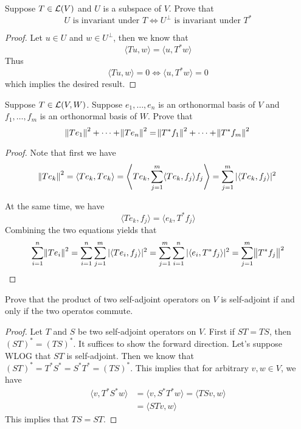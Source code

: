 \documentclass{extarticle}
\begin{document}
\begin{problem}{4}
    Suppose \(T \in \mathcal{L}(V)\) and \(U\) is a subspace of \(V\). Prove that 
    \[U \text{ is invariant under } T \Longleftrightarrow U^\perp \text{ is invariant under }T^*\]
\end{problem}

\begin{proof}
Let \(u \in U\) and \(w \in U^\perp\), then we know that 
\[\langle Tu,w \rangle = \langle u,T^*w \rangle\]
Thus 
\[\langle Tu,w \rangle = 0 \Longleftrightarrow \langle u,T^*w \rangle = 0\]
which implies the desired result.
\end{proof}

\begin{problem}{5}
    Suppose \(T \in \mathcal{L}(V, W)\). Suppose \(e_1, \ldots, e_n\) is an orthonormal basis of \(V\) and 
    \(f_1, \ldots, f_m\) is an orthonormal basis of \(W\). Prove that 
    \[\norm{T e_1}^2 + \cdots + \norm{T e_n}^2 = \norm{T^* f_1 }^2 + \cdots + \norm{T^* f_m}^2\]
\end{problem}

\begin{proof}
Note that first we have 
\[\norm{T e_k}^2 = \langle T e_k, T e_k \rangle 
= \left\langle T e_k, \sum_{j=1}^{m} \langle T e_k, f_j \rangle f_j \right\rangle 
= \sum_{j=1}^{m} |\langle T e_k, f_j \rangle|^2\]

At the same time, we have 
\[ \langle Te_k, f_j \rangle = \langle e_k, T^* f_j \rangle\]
Combining the two equations yields that 
\begin{align*}
    \sum_{i=1}^{n} \norm{T e_i}^2  
    = \sum_{i=1}^{n} \sum_{j=1}^{m} |\langle T e_i,f_j \rangle|^2  
    = \sum_{j=1}^{m} \sum_{i=1}^{n} |\langle e_i,T^* f_j \rangle|^2 
    = \sum_{j=1}^{m} \norm{T^* f_j}^2
\end{align*}
\end{proof}

\begin{problem}{9}
    Prove that the product of two self-adjoint operators on \(V\) is self-adjoint if and only if the 
    two operatos commute.
\end{problem}

\begin{proof}
Let \(T\) and \(S\) be two self-adjoint operators on \(V\). First if \(ST = TS\), then \((ST)^* 
= (TS)^*\). It suffices to show the forward direction. Let's suppose WLOG that \(ST\) is self-adjoint. 
Then we know that \((ST)^* = T^* S^* = S^* T^* = (TS)^*\). This implies that for arbitrary 
\(v, w \in V\), we have 
\begin{align*}
    \langle v,T^* S^* w \rangle 
    &= \langle v, S^* T^* w \rangle = \langle TSv,w \rangle \\ 
    &= \langle STv,w \rangle
\end{align*}
This implies that \(TS = ST\).
\end{proof}
\end{document}
